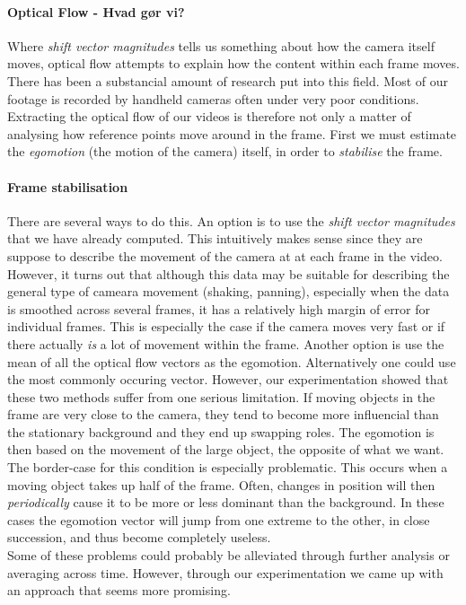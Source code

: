 \paragraph{Optical Flow - Hvad gør vi?}
%
Where \textit{shift vector magnitudes} tells us something about how the camera itself moves, optical flow attempts to explain how the content within each frame moves. There has been a substancial amount of research put into this field. Most of our footage is recorded by handheld cameras often under very poor conditions. Extracting the optical flow of our videos is therefore not only a matter of analysing how reference points move around in the frame. First we must estimate the \textit{egomotion} (the motion of the camera) itself, in order to \textit{stabilise} the frame.
%
\paragraph{Frame stabilisation}
%
There are several ways to do this. An option is to use the \textit{shift vector magnitudes} that we have already computed. This intuitively makes sense since they are suppose to describe the movement of the camera at at each frame in the video. However, it turns out that although this data may be suitable for describing the general type of cameara movement (shaking, panning), especially when the data is smoothed across several frames, it has a relatively high margin of error for individual frames. This is especially the case if the camera moves very fast or if there actually \textit{is} a lot of movement within the frame. Another option is use the mean of all the optical flow vectors as the egomotion. Alternatively one could use the most commonly occuring vector. However, our experimentation showed that these two methods suffer from one serious limitation. If moving objects in the frame are very close to the camera, they tend to become more influencial than the stationary background and they end up swapping roles. The egomotion is then based on the movement of the large object, the opposite of what we want. The border-case for this condition is especially problematic. This occurs when a moving object takes up half of the frame. Often, changes in position will then \textit{periodically} cause it to be more or less dominant than the background. In these cases the egomotion vector will jump from one extreme to the other, in close succession, and thus become completely useless.\\
Some of these problems could probably be alleviated through further analysis or averaging across time. However, through our experimentation we came up with an approach that seems more promising.\\
